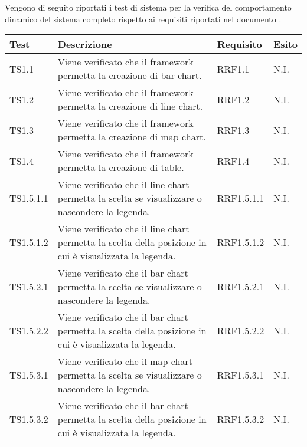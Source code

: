 Vengono di seguito riportati i test di sistema per la verifica del comportamento dinamico del sistema completo rispetto ai requisiti riportati nel documento .


\begin{longtabu}{| X[0.5] | X | X[0.5] | X[0.4] |}

			\hline
			\rowfont{\bf}
			Test &
			Descrizione &
			Requisito &
			Esito \\
			\hline \endhead


TS1.1 & Viene verificato che il framework permetta la creazione di bar chart. & RRF1.1 & N.I.\\ \hline

TS1.2 & Viene verificato che il framework permetta la creazione di line chart. & RRF1.2 & N.I.\\ \hline

TS1.3 & Viene verificato che il framework permetta la creazione di map chart. & RRF1.3 & N.I.\\ \hline

TS1.4 & Viene verificato che il framework permetta la creazione di table. & RRF1.4 & N.I.\\ \hline

TS1.5.1.1 & Viene verificato che il line chart permetta la scelta se visualizzare o nascondere la legenda. & RRF1.5.1.1 & N.I.\\ \hline

TS1.5.1.2 & Viene verificato che il line chart permetta la scelta della posizione in cui è visualizzata la legenda. & RRF1.5.1.2 & N.I.\\ \hline

TS1.5.2.1 & Viene verificato che il bar chart permetta la scelta se visualizzare o nascondere la legenda. & RRF1.5.2.1 & N.I.\\ \hline

TS1.5.2.2 & Viene verificato che il bar chart permetta la scelta della posizione in cui è visualizzata la legenda. & RRF1.5.2.2 & N.I.\\ \hline

TS1.5.3.1 & Viene verificato che il map chart permetta la scelta se visualizzare o nascondere la legenda. & RRF1.5.3.1 & N.I.\\ \hline

TS1.5.3.2 & Viene verificato che il bar chart permetta la scelta della posizione in cui è visualizzata la legenda. & RRF1.5.3.2 & N.I.\\ \hline


\end{longtabu}
